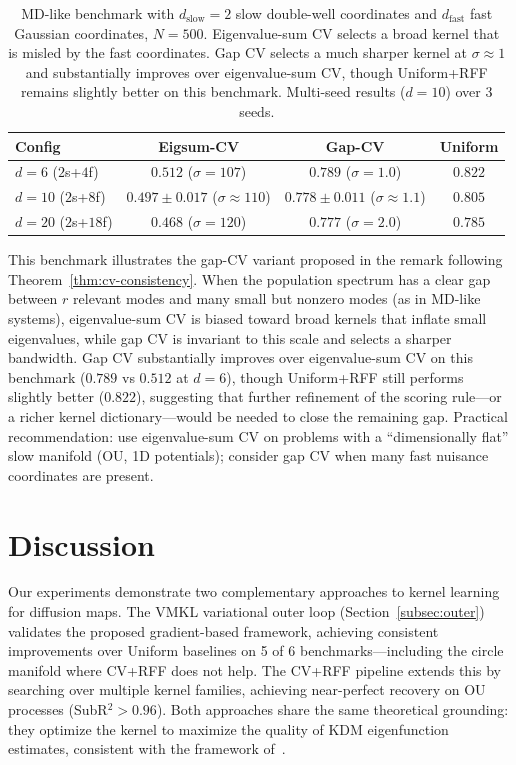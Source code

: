 \documentclass[11pt]{article}
\theoremstyle{remark}
\begin{document}
\begin{table}[t]
\centering
\begin{tabular}{lccc}
\toprule
Config & Eigsum-CV & Gap-CV & Uniform \\
\midrule
$d\!=\!6$  ($2$s+$4$f) & $0.512$ ($\sigma=107$) & $0.789$ ($\sigma=1.0$) & $\mathbf{0.822}$ \\
$d\!=\!10$ ($2$s+$8$f) & $0.497\pm0.017$ ($\sigma\approx 110$) & $0.778\pm0.011$ ($\sigma\approx 1.1$) & $\mathbf{0.805}$ \\
$d\!=\!20$ ($2$s+$18$f) & $0.468$ ($\sigma=120$) & $0.777$ ($\sigma=2.0$) & $\mathbf{0.785}$ \\
\bottomrule
\end{tabular}
\caption{MD-like benchmark with $d_\text{slow}=2$ slow double-well coordinates and $d_\text{fast}$ fast Gaussian coordinates, $N=500$. Eigenvalue-sum CV selects a broad kernel that is misled by the fast coordinates. Gap CV selects a much sharper kernel at $\sigma\approx 1$ and substantially improves over eigenvalue-sum CV, though Uniform+RFF remains slightly better on this benchmark. Multi-seed results ($d=10$) over 3 seeds.}
\label{tab:mdlike}
\end{table}

This benchmark illustrates the gap-CV variant proposed in the remark following Theorem~\ref{thm:cv-consistency}.
When the population spectrum has a clear gap between $r$ relevant modes and many small but nonzero modes (as in MD-like systems), eigenvalue-sum CV is biased toward broad kernels that inflate small eigenvalues, while gap CV is invariant to this scale and selects a sharper bandwidth.
Gap CV substantially improves over eigenvalue-sum CV on this benchmark ($0.789$ vs $0.512$ at $d=6$), though Uniform+RFF still performs slightly better ($0.822$), suggesting that further refinement of the scoring rule---or a richer kernel dictionary---would be needed to close the remaining gap.
Practical recommendation: use eigenvalue-sum CV on problems with a ``dimensionally flat'' slow manifold (OU, 1D potentials); consider gap CV when many fast nuisance coordinates are present.


\section{Discussion}
\label{sec:discussion}

Our experiments demonstrate two complementary approaches to kernel learning for diffusion maps.
The VMKL variational outer loop (Section~\ref{subsec:outer}) validates the proposed gradient-based framework, achieving consistent improvements over Uniform baselines on 5 of 6 benchmarks---including the circle manifold where CV+RFF does not help.
The CV+RFF pipeline extends this by searching over multiple kernel families, achieving near-perfect recovery on OU processes (SubR$^2>0.96$).
Both approaches share the same theoretical grounding: they optimize the kernel to maximize the quality of KDM eigenfunction estimates, consistent with the framework of~\citet{pmlr-v195-pillaud-vivien23a}.
\end{document}
